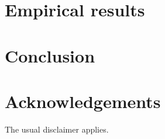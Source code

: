 \documentclass[12pt,a4paper]{article}
\begin{document}
\section{Empirical results}\label{sec:results}


\section{Conclusion}\label{sec:conclusion}


\newpage
\section*{Acknowledgements}

The usual disclaimer applies. 

\newpage


\clearpage


\end{document}
